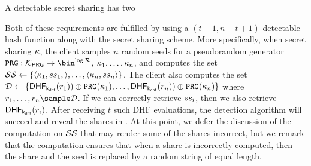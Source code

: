 \iffalse 
A detectable secret sharing has two

Both of these requirements are fulfilled by using a $(t-1, n - t + 1)$ detectable hash function along with the secret sharing scheme. More specifically, when secret sharing $\kappa$, the client samples $n$ random seeds for a pseudorandom generator $\prg: \prgKeySpace \rightarrow \bin^{\log \dhfRange}$,  
 $\kappa_1, \dots, \kappa_n$, and computes the set $\ssSet \assign \{\langle \genericSymmKey_1, \secretShare{1}, \rangle, \dots, \langle \genericSymmKey_n, \secretShare{n} \rangle \}$. The client also computes the set $\dhfSet \assign \{\dhf[\dhfKey](\genericRand[1])) \oplus \prg(\genericSymmKey_1), \dots, \dhf[\dhfKey](\genericRand[n]))\oplus \prg(\genericSymmKey_n)\}$ where $\genericRand[1], \dots, \genericRand[n] \sample \dhfDomain$. If we can correctly retrieve $ss_{i}$, then we also retrieve $\dhf[\dhfKey](\genericRand[i])$. After receiving $t$ such DHF evaluations, the detection algorithm will succeed and reveal the shares in \ssSet. At this point, we defer the discussion of the computation on $\ssSet$ that may render some of the shares incorrect, but we remark that the computation ensures that when a share is incorrectly computed, then the share and the seed is replaced by a random string of equal length.

